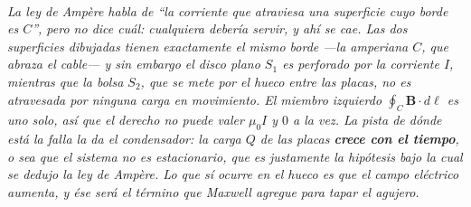 \begin{center}
\begin{tikzpicture}[scale=0.95, transform shape]
\end{tikzpicture}\\[0.5em]
{\small\itshape La ley de Ampère habla de \enquote{la corriente que atraviesa
una superficie cuyo borde es $C$}, pero no dice cuál: cualquiera debería
servir, y ahí se cae. Las dos superficies dibujadas tienen exactamente el mismo
borde ---la amperiana $C$, que abraza el cable--- y sin embargo el disco plano
$S_1$ es perforado por la corriente $I$, mientras que la bolsa $S_2$, que se
mete por el hueco entre las placas, no es atravesada por ninguna carga en
movimiento. El miembro izquierdo $\oint_C \mathbf{B}\cdot d\boldsymbol{\ell}$
es uno solo, así que el derecho no puede valer $\mu_0 I$ y $0$ a la vez. La
pista de dónde está la falla la da el condensador: la carga $Q$ de las placas
\textbf{crece con el tiempo}, o sea que el sistema no es estacionario, que es
justamente la hipótesis bajo la cual se dedujo la ley de Ampère. Lo que sí
ocurre en el hueco es que el campo eléctrico aumenta, y ése será el término que
Maxwell agregue para tapar el agujero.}
\end{center}
